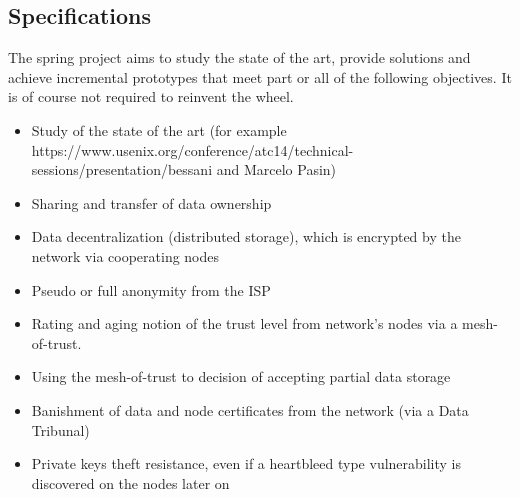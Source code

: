 
\subsection{Specifications}
The spring project aims to study the state of the art, provide solutions and achieve incremental prototypes that meet part or all of the following objectives. It is of course not required to reinvent the wheel.

\begin{itemize}
\item Study of the state of the art (for example https://www.usenix.org/conference/atc14/technical-sessions/presentation/bessani and Marcelo Pasin)
\item Sharing and transfer of data ownership
\item Data decentralization (distributed storage), which is encrypted by the network via cooperating nodes 
\item Pseudo or full anonymity from the ISP
\item Rating and aging notion of the trust level from network's nodes via a mesh-of-trust.
\item Using the mesh-of-trust to decision of accepting partial data storage
\item Banishment of data and node certificates from the network (via a Data Tribunal)
\item Private keys  theft resistance, even if a heartbleed\cite{Mehta2014TheBug} type vulnerability is discovered on the nodes later on\cite{Sullivan2014StayingVulnerabilities}
\end{itemize}

